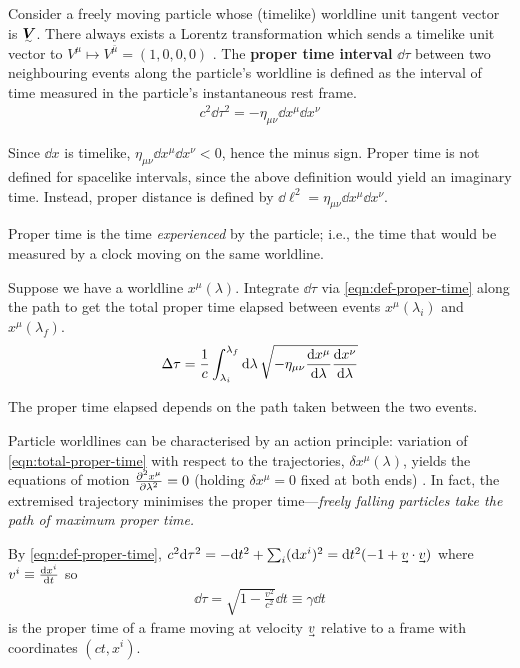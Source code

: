 Consider a freely moving particle whose (timelike) worldline unit tangent vector is $\ts V$.
There always exists a Lorentz transformation which sends a timelike unit vector to $V^\mu \mapsto V^{\bar\mu} = (1, 0, 0, 0)$ \exercise.
The \textbf{proper time interval} $\dd\tau$ between two neighbouring events along the particle's worldline is defined as the interval of time measured in the particle's instantaneous rest frame.
\begin{align}
	c^2\dd\tau^2 = -\eta_{\mu\nu}\dd x^\mu\dd x^\nu
	\label{eqn:def-proper-time}
\end{align}

\begin{note}
	Since $\dd x$ is timelike, $\eta_{\mu\nu}\dd x^\mu\dd x^\nu < 0$, hence the minus sign.
	Proper time is not defined for spacelike intervals, since the above definition would yield an imaginary time.
	Instead, proper distance is defined by $\dd\ell^2 = \eta_{\mu\nu}\dd x^\mu\dd x^\nu$.
\end{note}
Proper time is the time \emph{experienced} by the particle; i.e., the time that would be measured by a clock moving on the same worldline.

Suppose we have a worldline $x^\mu(\lambda)$.
Integrate $\dd\tau$ via \eqref{eqn:def-proper-time} along the path to get the total proper time elapsed between events $x^\mu(\lambda_i)$ and $x^\mu(\lambda_f)$.
\begin{align}
	\Delta\tau = \frac1c \int_{\lambda_i}^{\lambda_f} \dd\lambda \, \sqrt{-\eta_{\mu\nu}\dv{x^\mu}{\lambda}\dv{x^\nu}{\lambda}}
	\label{eqn:total-proper-time}
\end{align}
\begin{note}
	The proper time elapsed depends on the path taken between the two events.
\end{note}

Particle worldlines can be characterised by an action principle: variation of \eqref{eqn:total-proper-time} with respect to the trajectories, $\delta x^\mu(\lambda)$, yields the equations of motion $\pdv[2]{x^\mu}{\lambda} = 0$ (holding $\delta x^\mu = 0$ fixed at both ends) \exercise.
In fact, the extremised trajectory minimises the proper time---\emph{freely falling particles take the path of maximum proper time.}

By \eqref{eqn:def-proper-time},
\begin{math}
	c^2\dd\tau^2 = -\dd t^2 + \sum_i(\dd x^i)^2 = \dd t^2\qty(-1 + \uvec v\cdot\uvec v)
\end{math}
where $v^i \equiv \dv{x^i}{t}$ so
\begin{align}
	\dd\tau = \sqrt{1 - \frac{v^2}{c^2}}\dd t \equiv \gamma\dd t
\end{align}
is the proper time of a frame moving at velocity $\uvec v$ relative to a frame with coordinates $(ct, x^i)$.